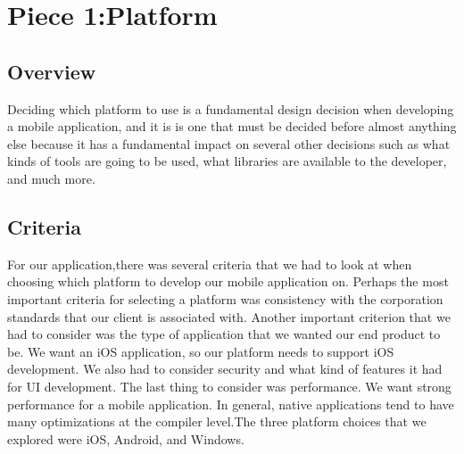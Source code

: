 \documentclass[onecolumn, draftclsnofoot,10pt, compsoc]{IEEEtran}
\begin{document}
\section{Piece 1:Platform}
	\subsection{Overview}
      Deciding which platform to use is a fundamental design decision when developing a mobile application, and it is is one that must be decided before almost anything else because it has a fundamental impact on several other decisions such as what kinds of tools are going to be used, what libraries are available to the developer, and much more. 
      \subsection{Criteria}
       For our application,there was several criteria that we had to look at when choosing which platform to develop our mobile application on. Perhaps the most important criteria for selecting a platform was consistency with the corporation standards that our client is associated with. Another important criterion that we had to consider was the type of application that we wanted our end product to be. We want an iOS application, so our platform needs to support iOS development. We also had to consider security and what kind of features it had for UI development. The last thing to consider was performance. We want strong performance for a mobile application. In general, native applications tend to have many optimizations at the compiler level.The three platform choices that we explored were iOS, Android, and Windows.
\end{document}
